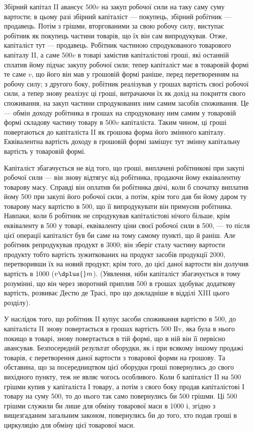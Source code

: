 
Збірний капітал II авансує $500v$ на закуп робочої сили на таку саму
суму вартости; в цьому разі збірний капіталіст — покупець, збірний
робітник — продавець. Потім з грішми, вторгованими за свою робочу силу,
виступає робітник як покупець частини товарів, що їх він сам випродукував.
Отже, капіталіст тут — продавець. Робітник частиною спродукованого
товарового капіталу II, а саме $500v$ в товарі замістив капіталістові
гроші, які останній сплатив йому підчас закупу робочої сили; тепер
капіталіст має в товаровій формі те саме $v$, що його він мав у грошовій
формі раніше, перед перетворенням на робочу силу; з другого боку,
робітник реалізував у грошах вартість своєї робочої сили, а тепер знову
реалізує ці гроші, витрачаючи їх як дохід на покриття свого споживання,
на закуп частини спродукованих ним самим засобів споживання. Це —
обмін доходу робітника в грошах на спродуковану ним самим у товаровій
формі складову частину товару в $500v$ капіталіста. Таким чином,
ці гроші повертаються до капіталіста II як грошова форма його змінного
капіталу. Еквівалентна вартість доходу в грошовій формі замішує тут
змінну капітальну вартість у товаровій формі.

Капіталіст збагачується не від того, що гроші, виплачені робітникові
при закупі робочої сили — він знову відтягує від робітника, продаючи йому
еквівалентну товарову масу. Справді він оплатив би робітника двічі, коли
б спочатку виплатив йому 500 при закупі його робочої сили, а потім,
крім того дав би йому даром ту товарову масу вартістю в 500, що її
випродукувати він примусив робітника. Навпаки, коли б робітник не
спродукував капіталістові нічого більше, крім еквіваленту в 500 у товарі,
еквіваленту ціни своєї робочої сили в 500, — то після цієї операції капіталіст
був би саме на тому самому пункті, що й раніш. Але робітник
репродукував продукт в 3000; він зберіг сталу частину вартости
продукту тобто вартість зужиткованих на продукт засобів продукції \deq{} 2000,
перетворивши їх на новий продукт; крім того, до цієї даної
вартости він долучив вартість в 1000 ($v \dplus{} m$). (Уявлення, ніби капіталіст
збагачується в тому розумінні, що він через зворотний приплив
500 в грошах здобуває додаткову вартість, розвиває Дестю де Трасі, про
що докладніше в відділі XIII цього розділу).

У наслідок того, що робітник II купує засоби споживання вартістю
в 500, до капіталіста II знову повертається в грошах вартість 500 ІІv,
яка була в нього покищо в товарі, знову повертається в тій формі, що
в ній він її первісно авансував. Безпосередній результат оборудки, як і
при всякому іншому продажі товарів, є перетворення даної вартости з
товарової форми на грошову. Та обставина, що за посередництвом цієї
оборудки гроші повернулись до свого вихідного пункту, теж не являє
чогось особливого. Коли б капіталіст II на 500 грішми купив у капіталіста
І товару, а потім з свого боку продав капіталістові І товару на
суму 500, то до нього так само повернулись би 500 грішми. Ці 500 грішми
служили би лише для обміну товарової маси в 1000 і, згідно з вищезгаданим
загальним законом, повернулись би до того, хто подав гроші в
циркуляцію для обміну цієї товарової маси.
